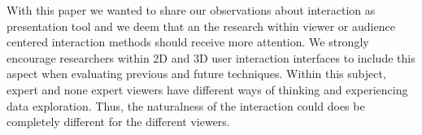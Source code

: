 \documentclass[review,journal]{vgtc}         %
\begin{document}
With this paper we wanted to share our observations about interaction as presentation tool and we deem that an the research within viewer or audience centered interaction methods should receive more attention. We strongly encourage researchers within 2D and 3D user interaction interfaces to include this aspect when evaluating previous and future techniques.
Within this subject, expert and none expert viewers have different ways of thinking and experiencing data exploration. Thus, the naturalness of the interaction could does be completely different for the different viewers.



\end{document}

